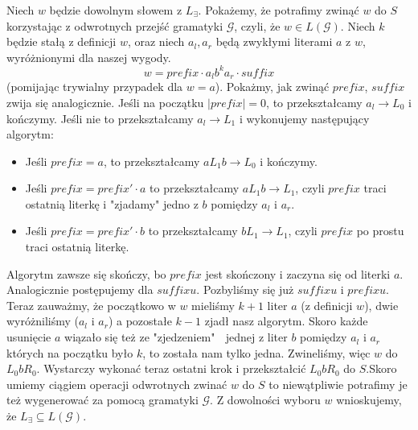 \documentclass{article}
\begin{document}
Niech $w$ będzie dowolnym słowem z $L_{\exists}$. Pokażemy, że potrafimy zwinąć $w$ do $S$ korzystając z odwrotnych przejść gramatyki $\mathcal{G}$, czyli, że $w \in L(\mathcal{G})$. \newline
Niech $k$ będzie stałą z definicji $w$, oraz niech $a_l, a_r$ będą zwykłymi literami $a$ z $w$, wyróżnionymi dla naszej wygody.
$$w = prefix \cdot a_lb^ka_r \cdot suffix$$ (pomijając trywialny przypadek dla $w = a$). \newline
Pokażmy, jak zwinąć $prefix$, $suffix$ zwija się analogicznie. \newline
Jeśli na początku $|prefix|=0$, to przekształcamy $a_l \to L_0$ i kończymy. \newline \newline
Jeśli nie to przekształcamy $a_l \to L_1$ i wykonujemy następujący algorytm: \newline 
\begin{itemize}
	\item[] Jeśli $prefix = a$, to przekształcamy $aL_1b \to L_0$ i kończymy.
	\item[] Jeśli $prefix = prefix' \cdot a$ to przekształcamy $aL_1b \to L_1$, czyli $prefix$ traci ostatnią literkę i "zjadamy" jedno z $b$ pomiędzy $a_l$ i $a_r$.
	\item[] Jeśli $prefix = prefix' \cdot b$ to przekształcamy $bL_1 \to L_1$, czyli $prefix$ po prostu traci ostatnią literkę.
\end{itemize}

Algorytm zawsze się skończy, bo $prefix$ jest skończony i zaczyna się od literki $a$. \newline
Analogicznie postępujemy dla $suffixu$. \newline
Pozbyliśmy się już $suffixu$ i $prefixu$. Teraz zauważmy, że początkowo w $w$ mieliśmy $k+1$ liter $a$ (z definicji $w$), dwie wyróżniliśmy ($a_l$ i $a_r$) a pozostałe $k-1$ zjadł nasz algorytm. Skoro każde usunięcie $a$ wiązało się też ze "zjedzeniem" $\;$ jednej z liter $b$ pomiędzy $a_l$ i $a_r$ których na początku było $k$, to została nam tylko jedna. \newline 
Zwineliśmy, więc $w$ do $L_0bR_0$. Wystarczy wykonać teraz ostatni krok i przekształcić $L_0bR_0$ do $S$.\newline \newline Skoro umiemy ciągiem operacji odwrotnych zwinać $w$ do $S$ to niewątpliwie potrafimy je też wygenerować za pomocą gramatyki $\mathcal{G}$. Z dowolności wyboru $w$ wnioskujemy, że $L_{\exists} \subseteq L(\mathcal{G})$.
\end{document}
